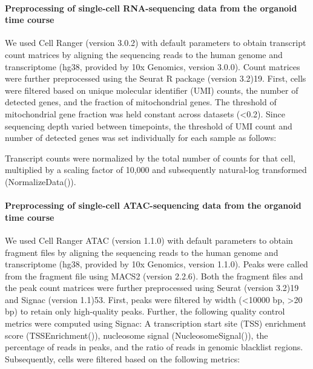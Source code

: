 \paragraph{Preprocessing of single-cell RNA-sequencing data from the organoid time course}
We used Cell Ranger (version 3.0.2) with default parameters to obtain transcript count matrices by aligning the sequencing reads to the human genome and transcriptome (hg38, provided by 10x Genomics, version 3.0.0). Count matrices were further preprocessed using the Seurat R package (version 3.2)19. First, cells were filtered based on unique molecular identifier (UMI) counts, the number of detected genes, and the fraction of mitochondrial genes. The threshold of mitochondrial gene fraction was held constant across datasets (<0.2). Since sequencing depth varied between timepoints, the threshold of UMI count and number of detected genes was set individually for each sample as follows:
 
 
Transcript counts were normalized by the total number of counts for that cell, multiplied by a scaling factor of 10,000 and subsequently natural-log transformed (NormalizeData()).
 
\paragraph{Preprocessing of single-cell ATAC-sequencing data from the organoid time course}
We used Cell Ranger ATAC (version 1.1.0) with default parameters to obtain fragment files by aligning the sequencing reads to the human genome and transcriptome (hg38, provided by 10x Genomics, version 1.1.0). Peaks were called from the fragment file using MACS2 (version 2.2.6). Both the fragment files and the peak count matrices were further preprocessed using Seurat (version 3.2)19 and Signac (version 1.1)53.  First, peaks were filtered by width (<10000 bp, >20 bp) to retain only high-quality peaks. Further, the following quality control metrics were computed using Signac: A transcription start site (TSS) enrichment score (TSSEnrichment()), nucleosome signal (NucleosomeSignal()), the percentage of reads in peaks, and the ratio of reads in genomic blacklist regions. Subsequently, cells were filtered based on the following metrics:
 
